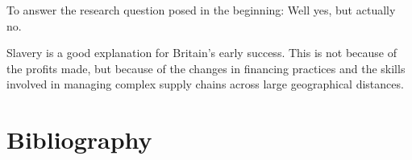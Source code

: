 \documentclass[a4paper,11pt]{article}
\begin{document}
To answer the research question posed in the beginning: Well yes, but actually no.\citep{wellyes}

Slavery is a good explanation for Britain's early success. This is not because of the profits made, but because of the changes in financing practices and the skills involved in managing complex supply chains across large geographical distances.

\pagebreak

\section*{Bibliography}

\end{document}
